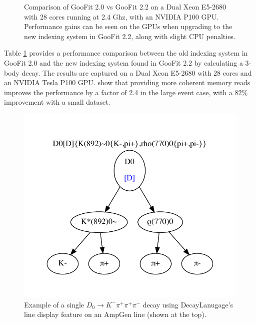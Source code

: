 \documentclass{webofc}
\begin{document}
\begin{figure}[h]
	\centering
	\label{figure-newindexspeed}
	\caption{Comparison of GooFit 2.0 vs GooFit 2.2 on a Dual Xeon E5-2680 with 28 cores running at 2.4 Ghz, with an NVIDIA P100 GPU. Performance gains can be seen on the GPUs when upgrading to the new indexing system in GooFit 2.2, along with slight CPU penalties.}
\end{figure}

Table \ref{figure-newindexspeed} provides a performance comparison between the old indexing system in GooFit 2.0 and the new indexing system found in GooFit 2.2 by calculating a 3-body decay. The results are captured on a Dual Xeon E5-2680 with 28 cores and an NVIDIA Tesla P100 GPU. show that providing more coherent memory reads improves the performance by a factor of 2.4 in the large event case, with a 82\% improvement with a small dataset.

\begin{figure}[ht]
	\centering
	\includegraphics[width=.5\textwidth]{LineExample}
	\caption{Example of a single $D_0 \rightarrow K^{-} \pi^{+} \pi^{+} \pi^{-}$ decay using DecayLanugage's line display feature on an AmpGen line (shown at the top).}
		\label{fig-ampgen}
\end{figure}
\end{document}
